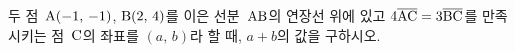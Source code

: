 두 점~$\mathrm{A}(-1,\,-1)$, $\mathrm{B}(2,\,4)$를 이은 선분~$\mathrm{AB}$의 연장선 위에 있고 $4\overline{\mathrm{AC}}=3\overline{\mathrm{BC}}$를 만족시키는 점~$\mathrm{C}$의 좌표를 $(a,\,b)$라 할 때, $a+b$의 값을 구하시오.
